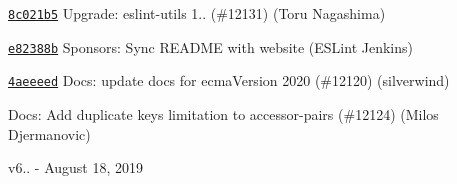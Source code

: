 \begin{DoxyItemize}
\item \href{https://github.com/eslint/eslint/commit/8c021b5917b3aa3c578ffe3972106d0a6bcf0838}{\texttt{ {\ttfamily 8c021b5}}} Upgrade\+: eslint-\/utils 1.. (\#12131) (Toru Nagashima)
\item \href{https://github.com/eslint/eslint/commit/e82388bd87717430200ec554634cc08806e38d3c}{\texttt{ {\ttfamily e82388b}}} Sponsors\+: Sync README with website (ESLint Jenkins)
\item \href{https://github.com/eslint/eslint/commit/4aeeeedb656ee3519ea82ebf0cb41ca801215046}{\texttt{ {\ttfamily 4aeeeed}}} Docs\+: update docs for ecma\+Version 2020 (\#12120) (silverwind)
\item \href{https://github.com/eslint/eslint/commit/6886148d1f528659ec3e125f61ef7a5f4c67556d}{\texttt{ {}}} Docs\+: Add duplicate keys limitation to accessor-\/pairs (\#12124) (Milos Djermanovic)
\end{DoxyItemize}

v6.. -\/ August 18, 2019


